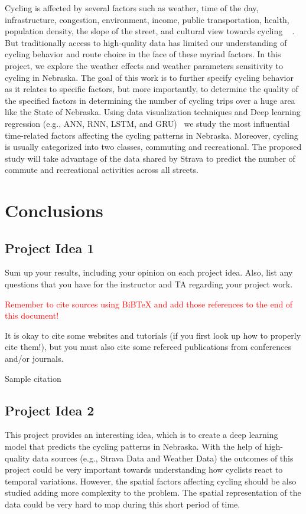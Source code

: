 \documentclass{report}
\begin{document}
Cycling is affected by several factors such as weather, time of the day, infrastructure, congestion, environment, income, public transportation, health, population density, the slope of the street, and cultural view towards cycling ~\cite{musakwa2016mapping, roy2019correcting, hochmair2019estimating} . But traditionally access to high-quality data has limited our understanding of cycling behavior and route choice in the face of these myriad factors. In this project, we explore the weather effects and weather parameters sensitivity to cycling in Nebraska. The goal of this work is to further specify cycling behavior as it relates to specific factors, but more importantly, to determine the quality of the specified factors in determining the number of cycling trips over a huge area like the State of Nebraska. 
Using data visualization techniques and Deep learning regression (e.g., ANN, RNN, LSTM, and GRU)~\cite{hassoun1995fundamentals, graves2013generating} we study the most influential time-related factors affecting the cycling patterns in Nebraska. Moreover, cycling is usually categorized into two classes, commuting and recreational. The proposed study will take advantage of the data shared by Strava to predict the number of commute and recreational activities across all streets. 

 

\section{Conclusions}
\subsection{Project Idea 1}
Sum up your results, including your opinion on each project idea.  Also, list any questions that you have for the instructor and TA regarding your project work.

\textcolor{red}{Remember to cite sources using BiBTeX and add those references to the end of this document!}

It is okay to cite some websites and tutorials (if you first look up how to properly cite them!), but you must also cite some refereed publications from conferences and/or journals.

Sample citation~\cite{Samuel59}

\subsection{Project Idea 2}
This project provides an interesting idea, which is to create a deep learning model that predicts the cycling patterns in Nebraska. With the help of high-quality data sources (e.g., Strava Data and Weather Data) the outcomes of this project could be very important towards understanding how cyclists react to temporal variations. However, the spatial factors affecting cycling should be also studied adding more complexity to the problem. The spatial representation of the data could be very hard to map during this short period of time. 
\end{document}
